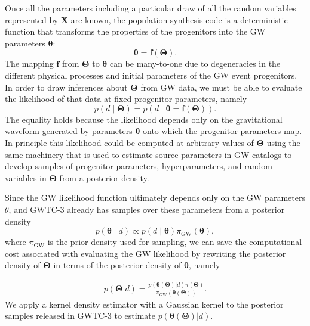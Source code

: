 \documentclass[twocolumn]{aastex631}
\begin{document}
Once all the parameters including a particular draw of all the random variables
represented by $\bm{X}$ are known, the population synthesis code is a
deterministic function that transforms the properties of the progenitors into
the GW parameters $\bm{\theta}$:
\begin{equation}
    \bm{\theta} = \bm{f}\left( \bm{\Theta} \right).
\end{equation}
The mapping $\bm{f}$ from $\bm{\Theta}$ to $\bm{\theta}$ can be many-to-one
due to degeneracies in the different physical processes and initial parameters
of the GW event progenitors.
In order to draw inferences about $\bm{\Theta}$ from GW data, we
must be able to evaluate the likelihood of that data at fixed progenitor
parameters, namely
\begin{equation}
    p\left( d \mid \bm{\Theta} \right) = p\left( d \mid \bm{\theta} = \bm{f}\left( \bm{\Theta} \right) \right).
\end{equation}
The equality holds because the likelihood depends only on the gravitational
waveform generated by parameters $\bm{\theta}$ onto which the progenitor
parameters map.  In principle this likelihood could be computed at arbitrary
values of $\bm{\Theta}$ using the same machinery that is used to estimate source
parameters in GW catalogs \citep{Veitch2015,Ashton2019,Romero-Shaw2020,GWTC-3}
to develop samples of progenitor parameters, hyperparameters, and random
variables in $\bm{\Theta}$ from a posterior density.

Since the GW likelihood function
ultimately depends only on the GW parameters $\theta$, and GWTC-3 already has samples over these parameters from a posterior density
\begin{equation}
    p\left( \bm{\theta} \mid d \right) \propto p\left( d \mid \bm{\theta} \right) \pi_\mathrm{GW} \left( \bm{\theta} \right),
\end{equation}
where $\pi_\mathrm{GW}$ is the prior density used for sampling, we can save the
computational cost associated with evaluating the GW likelihood by rewriting the
posterior density of $\bm{\Theta}$ in terms of the posterior density of
$\bm{\theta}$, namely

\begin{align}
    p(\bm{\Theta} | d) = \frac{p(\bm{\theta}(\bm{\Theta})| d) \pi(\bm{\Theta})}{\pi_\mathrm{GW}(\bm{\theta}(\bm{\Theta}))}.
\end{align}
We apply a kernel density estimator with a Gaussian kernel to the posterior
samples released in GWTC-3 to estimate $p(\bm{\theta}(\bm{\Theta})|d)$.
\end{document}

